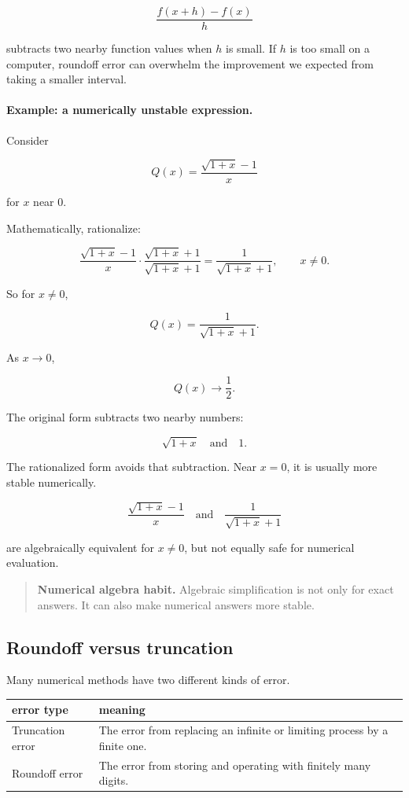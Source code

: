 \[
\frac{f(x+h)-f(x)}{h}
\]

subtracts two nearby function values when \(h\) is small.  If \(h\) is too small on a
computer, roundoff error can overwhelm the improvement we expected from taking a
smaller interval.

\paragraph{Example: a numerically unstable expression.}
Consider

\[
Q(x)=\frac{\sqrt{1+x}-1}{x}
\]

for \(x\) near \(0\).

Mathematically, rationalize:

\[
\frac{\sqrt{1+x}-1}{x}
\cdot
\frac{\sqrt{1+x}+1}{\sqrt{1+x}+1}
=
\frac{1}{\sqrt{1+x}+1},
\qquad x\neq0.
\]

So for \(x\neq0\),

\[
Q(x)=\frac{1}{\sqrt{1+x}+1}.
\]

As \(x\to0\),

\[
Q(x)\to \frac12.
\]

The original form subtracts two nearby numbers:

\[
\sqrt{1+x}
\quad\text{and}\quad
1.
\]

The rationalized form avoids that subtraction.  Near \(x=0\), it is usually more stable
numerically.

\[
\boxed{
\frac{\sqrt{1+x}-1}{x}
\quad\text{and}\quad
\frac{1}{\sqrt{1+x}+1}
}
\]

are algebraically equivalent for \(x\neq0\), but not equally safe for numerical
evaluation.

\begin{quote}
\textbf{Numerical algebra habit.}
Algebraic simplification is not only for exact answers.  It can also make numerical
answers more stable.
\end{quote}

\subsection{Roundoff versus truncation}
\label{appsubsec:roundoff-vs-truncation}

Many numerical methods have two different kinds of error.

\begin{center}
\renewcommand{\arraystretch}{1.6}
\begin{tabular}{p{}|p{}}
\textbf{error type} & \textbf{meaning} \\ \hline
Truncation error &
The error from replacing an infinite or limiting process by a finite one. \\

Roundoff error &
The error from storing and operating with finitely many digits.
\end{tabular}
\end{center}

